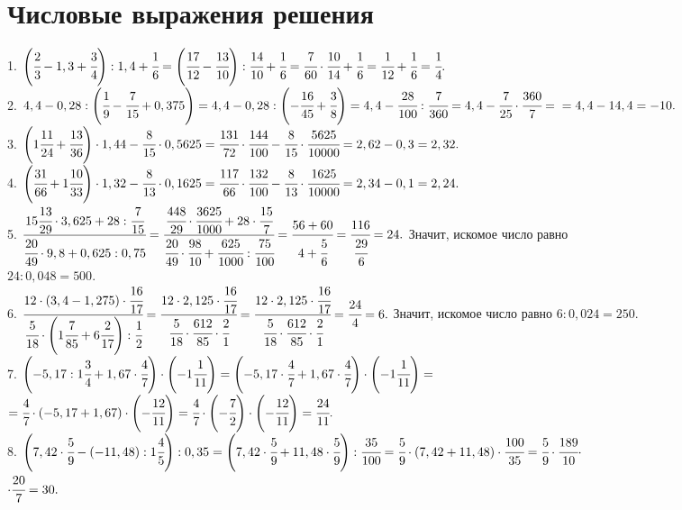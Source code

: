 \section{Числовые выражения решения}
1. $\left(\cfrac{2}{3}-1,3+\cfrac{3}{4}\right):1,4+\cfrac{1}{6}=\left(\cfrac{17}{12}-\cfrac{13}{10}\right):\cfrac{14}{10}+\cfrac{1}{6}=\cfrac{7}{60}\cdot\cfrac{10}{14}+\cfrac{1}{6}=
\cfrac{1}{12}+\cfrac{1}{6}=\cfrac{1}{4}.$\\
2. $4,4-0,28:\left(\cfrac{1}{9}-\cfrac{7}{15}+0,375\right)=4,4-0,28:\left(-\cfrac{16}{45}+\cfrac{3}{8}\right)=4,4-\cfrac{28}{100}:\cfrac{7}{360}=4,4-\cfrac{7}{25}\cdot\cfrac{360}{7}=
\\=4,4-14,4=-10.$\\
3. $\left(1\cfrac{11}{24}+\cfrac{13}{36}\right)\cdot1,44-\cfrac{8}{15}\cdot0,5625=\cfrac{131}{72}\cdot\cfrac{144}{100}-\cfrac{8}{15}\cdot\cfrac{5625}{10000}=
2,62-0,3=2,32.$\\
4. $\left(\cfrac{31}{66}+1\cfrac{10}{33}\right)\cdot1,32-\cfrac{8}{13}\cdot0,1625=\cfrac{117}{66}\cdot\cfrac{132}{100}-\cfrac{8}{13}\cdot\cfrac{1625}{10000}=
2,34-0,1=2,24.$\\
5. $\cfrac{15\cfrac{13}{29}\cdot3,625+28:\cfrac{7}{15}}{\cfrac{20}{49}\cdot9,8+0,625:0,75}=\cfrac{\cfrac{448}{29}\cdot\cfrac{3625}{1000}+28\cdot\cfrac{15}{7}}{\cfrac{20}{49}\cdot\cfrac{98}{10}+\cfrac{625}{1000}:\cfrac{75}{100}}=
\cfrac{56+60}{4+\cfrac{5}{6}}=\cfrac{116}{\cfrac{29}{6}}=24.$ Значит, искомое число равно \\$24:0,048=500.$\\
6. $\cfrac{12\cdot(3,4-1,275)\cdot\cfrac{16}{17}}{\cfrac{5}{18}\cdot\left(1\cfrac{7}{85}
+6\cfrac{2}{17}\right):\cfrac{1}{2}}=\cfrac{12\cdot2,125\cdot\cfrac{16}{17}}{\cfrac{5}{18}\cdot\cfrac{612}{85}\cdot\cfrac{2}{1}}=
\cfrac{12\cdot2,125\cdot\cfrac{16}{17}}{\cfrac{5}{18}\cdot\cfrac{612}{85}\cdot\cfrac{2}{1}}=\cfrac{24}{4}=6.$ Значит, искомое число равно $6:0,024=250.$\\
7. $\left(-5,17:1\cfrac{3}{4}+1,67\cdot\cfrac{4}{7}\right)\cdot\left(-1\cfrac{1}{11}\right)=\left(-5,17\cdot\cfrac{4}{7}+1,67\cdot\cfrac{4}{7}\right)\cdot\left(-1\cfrac{1}{11}\right)=$\\
$=\cfrac{4}{7}\cdot\left(-5,17+1,67\right)\cdot\left(-\cfrac{12}{11}\right)=\cfrac{4}{7}\cdot\left(-\cfrac{7}{2}\right)\cdot\left(-\cfrac{12}{11}\right)=\cfrac{24}{11}.$\\
8. $\left(7,42\cdot\cfrac{5}{9}-(-11,48):1\cfrac{4}{5}\right):0,35=\left(7,42\cdot\cfrac{5}{9}+11,48\cdot\cfrac{5}{9}\right):\cfrac{35}{100}=
\cfrac{5}{9}\cdot\left(7,42+11,48\right)\cdot\cfrac{100}{35}=\cfrac{5}{9}\cdot\cfrac{189}{10}\cdot$\\$\cdot\cfrac{20}{7}=30.$\\
